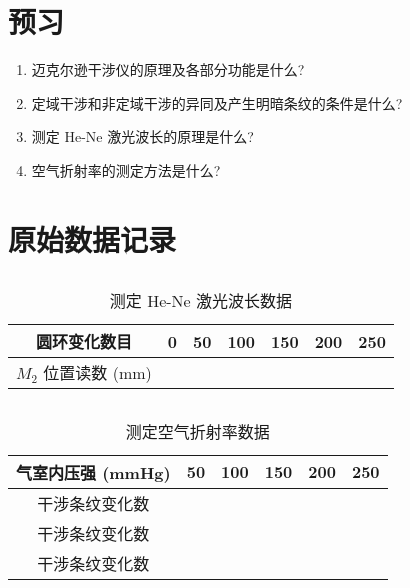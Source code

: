 \documentclass[signature=data]{physicsreport}
\begin{document}
\maketitle

\section{预习}
\begin{enumerate}
    \item 迈克尔逊干涉仪的原理及各部分功能是什么?
    \item 定域干涉和非定域干涉的异同及产生明暗条纹的条件是什么?
    \item 测定 He-Ne 激光波长的原理是什么?
    \item 空气折射率的测定方法是什么?
\end{enumerate}

\makeatletter
{}
\makeatother

\newpage
\section{原始数据记录}
\subsection{}
\begin{table}[H]
    \caption{测定 He-Ne 激光波长数据} \label{tab:1}
    \centering
    \begin{tabularx}{\textwidth}{|c|Y|Y|Y|Y|Y|Y|} \hline
        圆环变化数目          & 0 & 50 & 100 & 150 & 200 & 250 \\\hline
        $M_2$ 位置读数 (mm) &   &    &     &     &     &     \\\hline
    \end{tabularx}
\end{table}

\subsection{}
\begin{table}[H]
    \caption{测定空气折射率数据} \label{tab:2}
    \centering
    \begin{tabularx}{\textwidth}{|c|Y|Y|Y|Y|Y|} \hline
        气室内压强 (mmHg) & 50 & 100 & 150 & 200 & 250 \\\hline
        干涉条纹变化数      &    &     &     &     &     \\\hline
        干涉条纹变化数      &    &     &     &     &     \\\hline
        干涉条纹变化数      &    &     &     &     &     \\\hline
    \end{tabularx}
\end{table}
\end{document}

